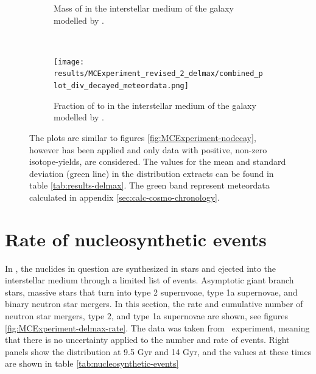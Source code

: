 \begin{figure}
\begin{subfigure}{\subfigwidth}
{      Mass of  in the interstellar medium of the galaxy modelled by \omegamodel.
    }
  \end{subfigure} \\
  \centering
  \begin{subfigure}{\figwidth}
    \texttt{[image: results/MCExperiment\_revised\_2\_delmax/combined\_plot\_div\_decayed\_meteordata.png]}
    \caption{ \label{fig:MCExperiment-delmax-div} \footnotesize
      Fraction of  to  in the interstellar medium of the galaxy modelled by \omegamodel.
    }
  \end{subfigure}
  \caption[\expone\ with \betadecay and removing negative isotope yields]{ \label{fig:MCExperiment-delmax}
    The plots are similar to figures \ref{fig:MCExperiment-nodecay}, however \betadecay has been applied and only data with positive, non-zero isotope-yields, are considered.
    The values for the mean and standard deviation (green line) in the distribution extracts can be found in table \ref{tab:results-delmax}.
    The green band represent meteordata calculated in appendix \ref{sec:calc-cosmo-chronology}.
  }
\end{figure}
\FloatBarrier %

\section{Rate of nucleosynthetic events}
In \omegamodel, the nuclides in question are synthesized in stars and ejected into the interstellar medium through a limited list of events.
Asymptotic giant branch stars, massive stars that turn into type 2 supernvoae, type 1a supernovae, and binary neutron star mergers.
In this section, the rate and cumulative number of neutron star mergers, type 2, and type 1a supernovae are shown, see figures \ref{fig:MCExperiment-delmax-rate}.
The data was taken from \expone\ experiment, meaning that there is no uncertainty applied to the number and rate of events.
Right panels show the distribution at 9.5 Gyr and 14 Gyr, and the values at these times are shown in table \ref{tab:nucleosynthetic-events}


